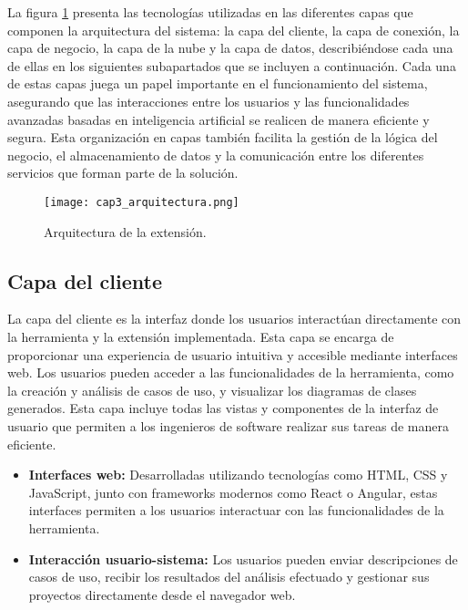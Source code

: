 La figura \ref{fig:cap3_arquitectura} presenta las tecnologías utilizadas en las diferentes capas que componen la arquitectura del sistema: la capa del cliente, la capa de conexión, la capa de negocio, la capa de la nube y la capa de datos, describiéndose cada una de ellas en los siguientes subapartados que se incluyen a continuación. Cada una de estas capas juega un papel importante en el funcionamiento del sistema, asegurando que las interacciones entre los usuarios y las funcionalidades avanzadas basadas en inteligencia artificial se realicen de manera eficiente y segura. Esta organización en capas también facilita la gestión de la lógica del negocio, el almacenamiento de datos y la comunicación entre los diferentes servicios que forman parte de la solución.

\begin{figure}[H]  
	\centering
	\texttt{[image: cap3\_arquitectura.png]}
	\caption{Arquitectura de la extensión.}
	\label{fig:cap3_arquitectura}
\end{figure}


\subsection{Capa del cliente}

La capa del cliente es la interfaz donde los usuarios interactúan directamente con la herramienta y la extensión implementada. Esta capa se encarga de proporcionar una experiencia de usuario intuitiva y accesible mediante interfaces web. Los usuarios pueden acceder a las funcionalidades de la herramienta, como la creación y análisis de casos de uso, y visualizar los diagramas de clases generados. Esta capa incluye todas las vistas y componentes de la interfaz de usuario que permiten a los ingenieros de software realizar sus tareas de manera eficiente.

\begin{itemize}
	\item \textbf{Interfaces web:} Desarrolladas utilizando tecnologías como HTML, CSS y JavaScript, junto con frameworks modernos como React o Angular, estas interfaces permiten a los usuarios interactuar con las funcionalidades de la herramienta.
	\item \textbf{Interacción usuario-sistema:} Los usuarios pueden enviar descripciones de casos de uso, recibir los resultados del análisis efectuado y gestionar sus proyectos directamente desde el navegador web.
\end{itemize}

